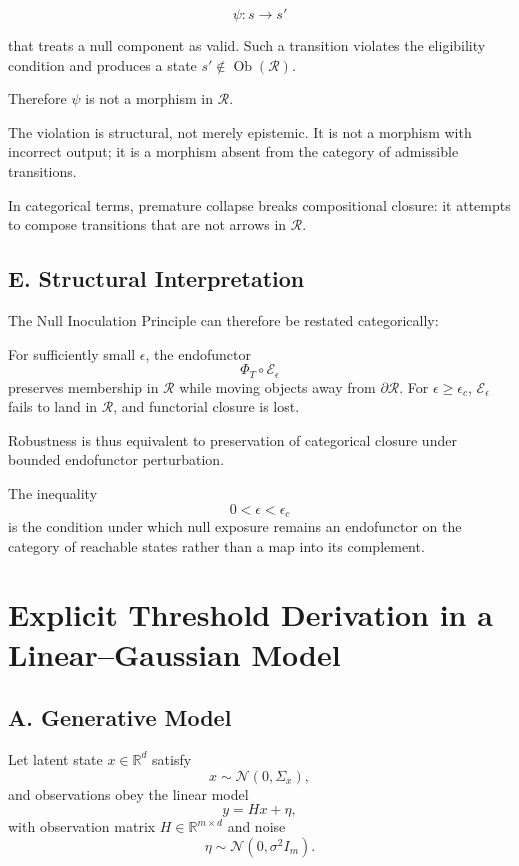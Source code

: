 \documentclass[11pt]{article}
\theoremstyle{remark}
\begin{document}
\[
\psi : s \to s'
\]

that treats a null component as valid. Such a transition violates the eligibility condition and produces a state $s' \notin \operatorname{Ob}(\mathcal{R})$.

Therefore $\psi$ is not a morphism in $\mathcal{R}$.

The violation is structural, not merely epistemic. It is not a morphism with incorrect output; it is a morphism absent from the category of admissible transitions.

In categorical terms, premature collapse breaks compositional closure: it attempts to compose transitions that are not arrows in $\mathcal{R}$.

\subsection*{E. Structural Interpretation}

The Null Inoculation Principle can therefore be restated categorically:

For sufficiently small $\epsilon$, the endofunctor
\[
\Phi_T \circ \mathcal{E}_\epsilon
\]
preserves membership in $\mathcal{R}$ while moving objects away from $\partial \mathcal{R}$. For $\epsilon \geq \epsilon_c$, $\mathcal{E}_\epsilon$ fails to land in $\mathcal{R}$, and functorial closure is lost.

Robustness is thus equivalent to preservation of categorical closure under bounded endofunctor perturbation.

The inequality
\[
0 < \epsilon < \epsilon_c
\]
is the condition under which null exposure remains an endofunctor on the category of reachable states rather than a map into its complement.

\section{Explicit Threshold Derivation in a Linear--Gaussian Model}
\label{app:linear_gaussian}

\subsection*{A. Generative Model}

Let latent state $x \in \mathbb{R}^d$ satisfy
\[
x \sim \mathcal{N}(0, \Sigma_x),
\]
and observations obey the linear model
\[
y = Hx + \eta,
\]
with observation matrix $H \in \mathbb{R}^{m \times d}$ and noise
\[
\eta \sim \mathcal{N}(0, \sigma^2 I_m).
\]
\end{document}
